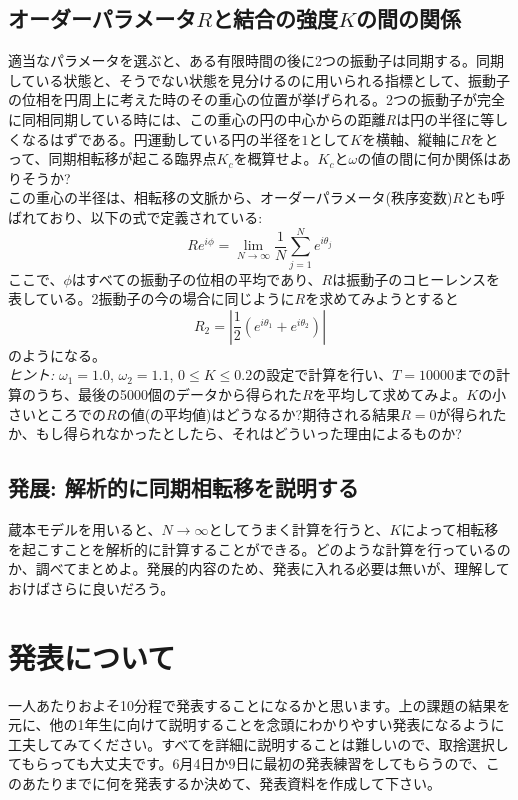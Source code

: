 \documentclass{jsarticle}
\begin{document}
\subsection{オーダーパラメータ$R$と結合の強度$K$の間の関係}
    適当なパラメータを選ぶと、ある有限時間の後に2つの振動子は同期する。同期している状態と、そうでない状態を見分けるのに用いられる指標として、振動子の位相を円周上に考えた時のその重心の位置が挙げられる。2つの振動子が完全に同相同期している時には、この重心の円の中心からの距離$R$は円の半径に等しくなるはずである。円運動している円の半径を$1$として$K$を横軸、縦軸に$R$をとって、同期相転移が起こる臨界点$K_{c}$を概算せよ。$K_{c}$と$\omega$の値の間に何か関係はありそうか?\\
    この重心の半径は、相転移の文脈から、オーダーパラメータ(秩序変数)$R$とも呼ばれており、以下の式で定義されている:
    $$Re^{i\phi} = \lim_{N\rightarrow \infty}\frac{1}{N}\sum_{j=1}^{N} e^{i\theta_{j}}$$
    ここで、$\phi$はすべての振動子の位相の平均であり、$R$は振動子のコヒーレンスを表している。2振動子の今の場合に同じように$R$を求めてみようとすると
    $$R_{2} = \left| \frac{1}{2} (e^{i\theta_{1}} + e^{i\theta_{2}}) \right|$$
    のようになる。\\
    \emph{ヒント:} $\omega_{1} = 1.0$, $\omega_{2} = 1.1$, $0\le K \le 0.2$の設定で計算を行い、$T=10000$までの計算のうち、最後の5000個のデータから得られた$R$を平均して求めてみよ。$K$の小さいところでの$R$の値(の平均値)はどうなるか?期待される結果$R=0$が得られたか、もし得られなかったとしたら、それはどういった理由によるものか?

\subsection{発展: 解析的に同期相転移を説明する}
蔵本モデルを用いると、$N\rightarrow \infty$としてうまく計算を行うと、$K$によって相転移を起こすことを解析的に計算することができる。どのような計算を行っているのか、調べてまとめよ。発展的内容のため、発表に入れる必要は無いが、理解しておけばさらに良いだろう。

\section{発表について}

一人あたりおよそ10分程で発表することになるかと思います。上の課題の結果を元に、他の1年生に向けて説明することを念頭にわかりやすい発表になるように工夫してみてください。すべてを詳細に説明することは難しいので、取捨選択してもらっても大丈夫です。6月4日か9日に最初の発表練習をしてもらうので、このあたりまでに何を発表するか決めて、発表資料を作成して下さい。
\end{document}
